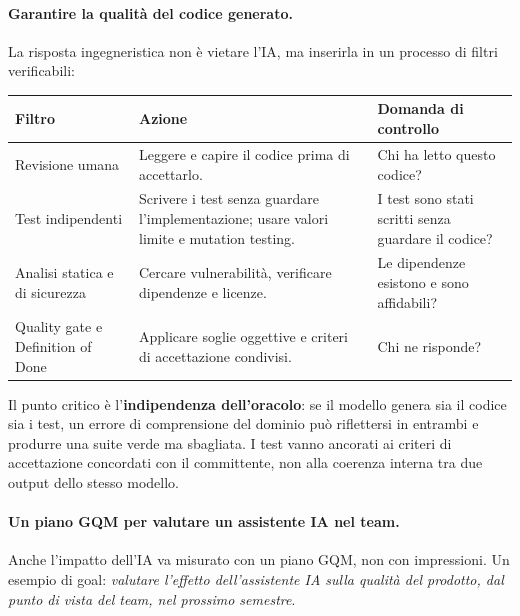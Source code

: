 \documentclass[12pt]{extarticle}
\begin{document}
\paragraph{Garantire la qualità del codice generato.}
La risposta ingegneristica non è vietare l'IA, ma inserirla in un processo di filtri verificabili:

\begin{center}
\small
\begin{tabular}{p{4.2cm}p{6.4cm}p{5.4cm}}
    \toprule
    \textbf{Filtro} & \textbf{Azione} & \textbf{Domanda di controllo} \\
    \midrule
    Revisione umana & Leggere e capire il codice prima di accettarlo. & Chi ha letto questo codice? \\
    \addlinespace
    Test indipendenti & Scrivere i test senza guardare l'implementazione; usare valori limite e mutation testing. & I test sono stati scritti senza guardare il codice? \\
    \addlinespace
    Analisi statica e di sicurezza & Cercare vulnerabilità, verificare dipendenze e licenze. & Le dipendenze esistono e sono affidabili? \\
    \addlinespace
    Quality gate e Definition of Done & Applicare soglie oggettive e criteri di accettazione condivisi. & Chi ne risponde? \\
    \bottomrule
\end{tabular}
\end{center}

\noindent Il punto critico è l'\textbf{indipendenza dell'oracolo}: se il modello genera sia il codice sia i test, un errore di comprensione del dominio può riflettersi in entrambi e produrre una suite verde ma sbagliata. I test vanno ancorati ai criteri di accettazione concordati con il committente, non alla coerenza interna tra due output dello stesso modello.

\paragraph{Un piano GQM per valutare un assistente IA nel team.}
Anche l'impatto dell'IA va misurato con un piano GQM, non con impressioni. Un esempio di goal: \textit{valutare l'effetto dell'assistente IA sulla qualità del prodotto, dal punto di vista del team, nel prossimo semestre}.
\end{document}
